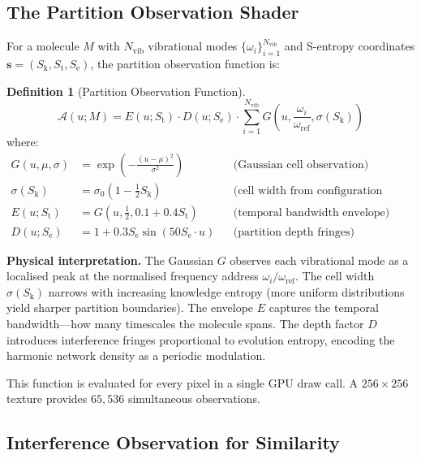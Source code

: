 \documentclass[11pt,twocolumn,a4paper]{article}
\theoremstyle{definition}
\newtheorem{definition}[theorem]{Definition}
\theoremstyle{remark}
\newcommand{\Sk}{S_{\mathrm{k}}}
\newcommand{\St}{S_{\mathrm{t}}}
\newcommand{\Se}{S_{\mathrm{e}}}
\newcommand{\Nvib}{N_{\mathrm{vib}}}
\begin{document}
\subsection{The Partition Observation Shader}

For a molecule $M$ with $\Nvib$ vibrational modes $\{\omega_i\}_{i=1}^{\Nvib}$ and S-entropy coordinates $\mathbf{s} = (\Sk, \St, \Se)$, the partition observation function is:

\begin{definition}[Partition Observation Function]
\label{def:pof}
\begin{equation}
\mathcal{A}(u; M) = E(u; \St) \cdot D(u; \Se) \cdot \sum_{i=1}^{\Nvib} G\!\left(u, \frac{\omega_i}{\omega_{\mathrm{ref}}}, \sigma(\Sk)\right)
\label{eq:pof}
\end{equation}
where:
\begin{align}
G(u, \mu, \sigma) &= \exp\!\left(-\frac{(u - \mu)^2}{\sigma^2}\right) & &\text{(Gaussian cell observation)} \label{eq:gaussian_cell} \\
\sigma(\Sk) &= \sigma_0(1 - \tfrac{1}{2}\Sk) & &\text{(cell width from configuration entropy)} \label{eq:cell_width} \\
E(u; \St) &= G(u, \tfrac{1}{2}, 0.1 + 0.4\St) & &\text{(temporal bandwidth envelope)} \label{eq:envelope} \\
D(u; \Se) &= 1 + 0.3\Se \sin(50 \Se \cdot u) & &\text{(partition depth fringes)} \label{eq:depth}
\end{align}
\end{definition}

\textbf{Physical interpretation.} The Gaussian $G$ observes each vibrational mode as a localised peak at the normalised frequency address $\omega_i/\omega_{\mathrm{ref}}$. The cell width $\sigma(\Sk)$ narrows with increasing knowledge entropy (more uniform distributions yield sharper partition boundaries). The envelope $E$ captures the temporal bandwidth---how many timescales the molecule spans. The depth factor $D$ introduces interference fringes proportional to evolution entropy, encoding the harmonic network density as a periodic modulation.

This function is evaluated for every pixel in a single GPU draw call. A $256 \times 256$ texture provides $65{,}536$ simultaneous observations.

\subsection{Interference Observation for Similarity}
\end{document}
